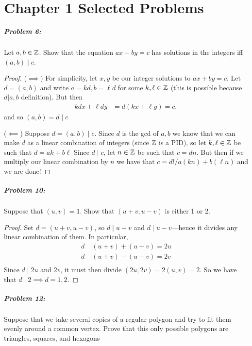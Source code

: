 \chapter*{Chapter 1 Selected Problems}

\paragraph{Problem 6:} Let \(a,b \in \mathbb{Z} \). Show that the equation
\(ax+by =c\) has solutions in the integers iff \((a,b)\mid c\).

\begin{proof}
  (\(\implies \)) For simplicity, let \(x,y\) be our integer solutions to
  \(ax+by=c\). Let \(d=(a,b)\) and write \(a=kd, b=\ell d\) for some
  \(k, \ell \in \mathbb{Z} \) (this is possible because \(d|a,b\) definition). But then
  \begin{align*}
    kdx+\ell dy &= d(kx + \ell y) = c,
  \end{align*}
  and so \((a,b) = d \mid c\)

  (\(\impliedby \)) Suppose \(d=(a,b) \mid c\). Since \(d\) is the gcd of
  \(a,b\) we know that we can make \(d\) as a linear combination of integers
  (since \(\mathbb{Z} \) is a PID), so let \(k,\ell \in \mathbb{Z} \) be such that
  \(d=ak+b\ell\)
  Since \(d\mid c\), let \(n \in \mathbb{Z} \) be such that \(c=dn\). But then if we
  multiply our linear combination by \(n\) we have that
  \(c=dl / a(kn) + b(\ell n)\) and we are done!
\end{proof}

\paragraph{Problem 10:} Suppose that \((u,v)=1\). Show that \((u+v,u-v)\) is
either 1 or 2.

\begin{proof}
  Set \(d= (u+v,u-v)\), so \(d\mid u+v\) and \(d\mid u-v\)---hence it divides
  any linear combination of them. In particular,
  \begin{align*}
    d &\mid  (u+v)+(u-v) = 2u \\
    d &\mid  (u+v)-(u-v) = 2v \\
  \end{align*}
  Since \(d\mid 2u\) and \(2v\), it must then divide \((2u,2v)=2(u,v)=2\). So we
  have that \(d\mid 2 \implies d=1,2\).
\end{proof}

\paragraph{Problem 12:} Suppose that we take several copies of a regular polygon
and try to fit them evenly around a common vertex. Prove that this only possible
polygons are triangles, squares, and hexagons

